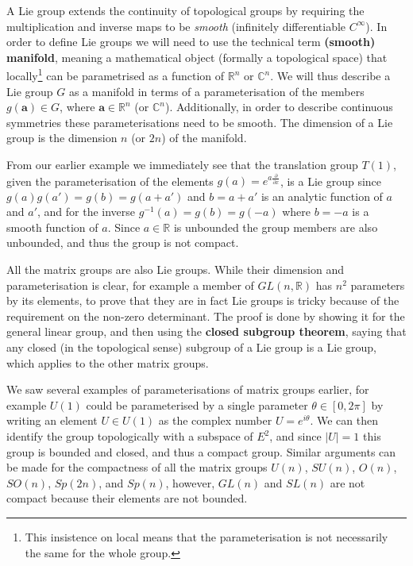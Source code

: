 \documentclass[notes.tex]{subfiles}
\begin{document}
A Lie group extends the continuity of topological groups by requiring the multiplication and inverse maps to be {\it smooth} (infinitely differentiable $C^\infty$).
In order to define Lie groups we will need to use the technical term {\bf (smooth) manifold}, meaning a mathematical object (formally a topological space) that locally\footnote{This insistence on local means that the parameterisation is not necessarily the same for the whole group.} can be parametrised as a function of  $\mathbb{R}^n$ or $\mathbb{C}^n$. We will thus describe a Lie group $G$ as a manifold in terms of a parameterisation of the members $g(\mathbf a)\in G$, where $\mathbf a\in \mathbb{R}^n$ (or $\mathbb{C}^n$). Additionally, in order to describe continuous symmetries these parameterisations need to be smooth.
The dimension of a Lie group is the dimension $n$ (or $2n$) of the manifold.

From our earlier example we immediately see that the translation group $T(1)$, given the parameterisation of the elements $g(a) = e^{a\frac{\partial}{\partial x}}$, is a Lie group since $g(a)g(a') =g(b)= g(a+a')$ and $b=a+a'$ is an analytic function of $a$ and $a'$, and for the inverse $g^{-1}(a)=g(b)=g(-a)$ where $b=-a$ is a smooth function of $a$. Since $a\in\mathbb R$ is unbounded the group members are also unbounded, and thus the group is not compact.

All the matrix groups are also Lie groups. While their dimension and parameterisation is clear, for example a member of $GL(n,\mathbb R)$ has $n^2$ parameters by its elements, to prove that they are in fact Lie groups is tricky because of the requirement on the non-zero determinant. The proof is done by showing it for the general linear group, and then using the {\bf closed subgroup theorem}, saying that any closed (in the topological sense) subgroup of a Lie group is a Lie group, which applies to the other matrix groups. 

We saw several examples of parameterisations of matrix groups earlier, for example $U(1)$ could be parameterised by a single parameter $\theta\in [0,2\pi]$ by writing an element $U\in U(1)$ as the complex number $U=e^{i\theta}$. We can then identify the group topologically with a subspace of $E^2$, and since $|U|=1$ this group is bounded and closed, and thus a compact group. Similar arguments can be made for the compactness of all the matrix groups $U(n)$, $SU(n)$, $O(n)$, $SO(n)$, $Sp(2n)$, and $Sp(n)$, however, $GL(n)$ and $SL(n)$ are not compact because their elements are not bounded.
\end{document}
